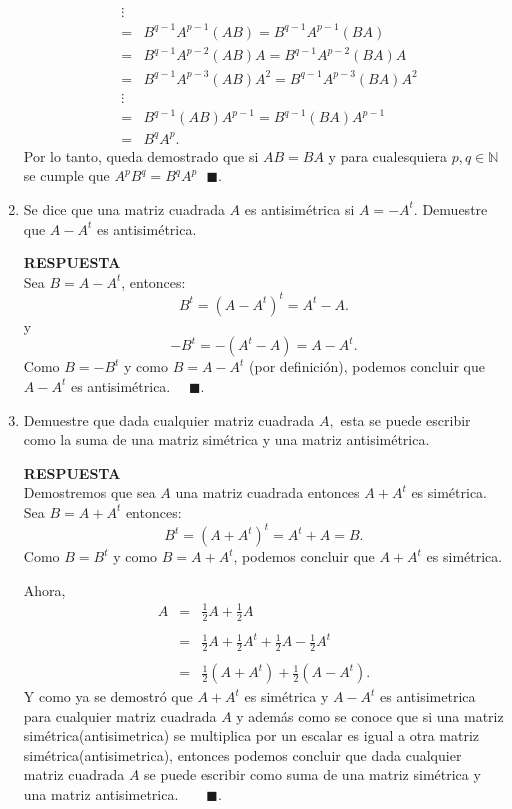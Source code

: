 \documentclass[11pt,letterpaper]{article}
\newcommand{\res}{\textbf{RESPUESTA}\\}
\newcommand{\fin}{$\blacksquare.$}
\newcommand{\finf}{\blacksquare.}
\begin{document}
\begin{enumerate}
\begin{equation*}
\begin{array}{ccc}
&\vdots&\\
&=&B^{q-1}A^{p-1}(AB)=B^{q-1}A^{p-1}(BA)\\
&=&B^{q-1}A^{p-2}(AB)A=B^{q-1}A^{p-2}(BA)A\\
&=&B^{q-1}A^{p-3}(AB)A^2=B^{q-1}A^{p-3}(BA)A^2\\
&\vdots&\\
&=&B^{q-1}(AB)A^{p-1}=B^{q-1}(BA)A^{p-1}\\
&=&B^qA^{p}.
\end{array}
\end{equation*}
Por lo tanto, queda demostrado que si $AB=BA$ y para cualesquiera $p,q\in \mathbb{N}$ se cumple que $A^pB^q=B^qA^p \ \ \ \finf$ 
\item Se dice que una matriz cuadrada $A$ es antisimétrica si $A=-A^t.$ Demuestre que $A-A^t$ es antisimétrica.

\res
Sea $B=A-A^t$, entonces:
$$B^t=(A-A^t)^t=A^t-A.$$
y $$-B^t=-(A^t-A)=A-A^t.$$
Como $B=-B^t$ y como $B=A-A^t$ (por definición), podemos concluir que   $A-A^t$ es antisimétrica. \ \ \fin

\item Demuestre que dada cualquier matriz cuadrada $A,$ esta se puede escribir como la suma de una matriz simétrica y una matriz antisimétrica.

\res
Demostremos que sea $A$ una matriz cuadrada entonces $A+A^t$ es simétrica. Sea $B=A+A^t$ entonces:
$$B^t=(A+A^t)^t=A^t+A=B.$$
Como $B=B^t$ y como $B=A+A^t$, podemos concluir que $A+A^t$ es simétrica. 

Ahora,
\begin{equation*}
\begin{array}{ccc}
A&=&\frac{1}{2}A+\frac{1}{2}A\\
&&\\
&=&\frac{1}{2}A+\frac{1}{2}A^t+\frac{1}{2}A-\frac{1}{2}A^t\\
&&\\
&=&\frac{1}{2}(A+A^t)+\frac{1}{2}(A-A^t). 
\end{array}
\end{equation*}	
Y como ya se demostró que $A+A^t$ es simétrica y $A-A^t$ es antisimetrica para cualquier matriz cuadrada $A$ y además como se conoce que si una matriz simétrica(antisimetrica) se multiplica por un escalar es igual a otra matriz simétrica(antisimetrica), entonces podemos concluir que dada cualquier matriz cuadrada $A$ se puede escribir como suma de una matriz simétrica y una matriz antisimetrica.\ \ \ \ \fin 


\end{enumerate}
\end{document}
